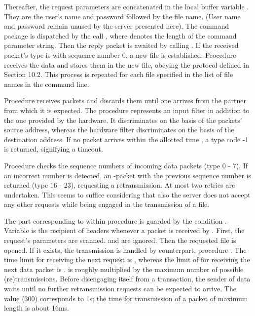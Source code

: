 Thereafter, the request parameters are concatenated in the local buffer variable . They are the user's name and password followed by the file name. (User name and password remain unused by the server presented here). The command package is dispatched by the call , where  denotes the length of the command parameter string. Then the reply packet is awaited by calling . If the received packet's type is  with sequence number 0, a new file is established. Procedure  receives the data and stores them in the new file, obeying the protocol defined in Section 10.2. This process is repeated for each file specified in the list of file names in the command line.

Procedure  receives packets and discards them until one arrives from the partner from which it is expected. The procedure represents an input filter in addition to the one provided by the hardware. It discriminates on the basis of the packets' source address, whereas the hardware filter discriminates on the basis of the destination address. If no packet arrives within the allotted time , a type code -1 is returned, signifying a timeout.

Procedure  checks the sequence numbers of incoming data packets (type 0 - 7). If an incorrect number is detected, an -packet with the previous sequence number is returned (type 16 - 23), requesting a retransmission. At most two retries are undertaken. This seems to suffice considering that also the server does not accept any other requests while being engaged in the transmission of a file.

The part corresponding to  within procedure  is guarded by the condition  \equiv {}. Variable  is the recipient of headers whenever a packet is received by . First, the request's parameters are scanned.  and  are ignored. Then the requested file is opened. If it exists, the transmission is handled by  counterpart, procedure . The time limit for receiving the next request is , whereas the limit of  for receiving the next data packet is .  is roughly  multiplied by the maximum number of possible (re)transmissions. Before disengaging itself from a transaction, the sender of data waits until no further retransmission requests can be expected to arrive. The value  (300) corresponds to 1s; the time for transmission of a packet of maximum length is about 16ms.

